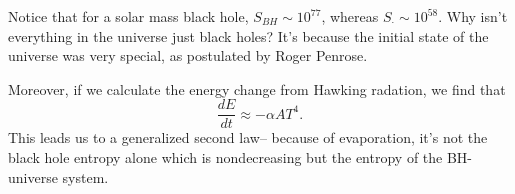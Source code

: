Notice that for a solar mass black hole, $S_{BH}\sim 10^{77}$, whereas $S_\cdot \sim 10^{58}$. Why isn't everything in the universe just black holes? It's because the initial state of the universe was very special, as postulated by Roger Penrose.

Moreover, if we calculate the energy change from Hawking radation, we find that
\begin{equation}
    \frac{dE}{dt} \approx -\alpha A T^4.
\end{equation}
This leads us to a generalized second law-- because of evaporation, it's not the black hole entropy alone which is nondecreasing but the entropy of the BH-universe system.
